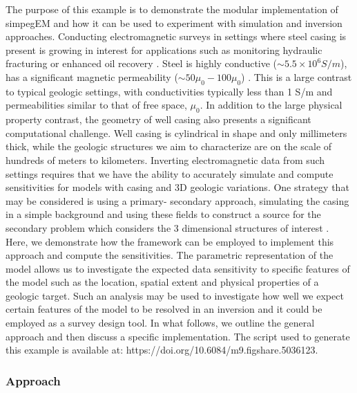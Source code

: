 The purpose of this example is to demonstrate the modular implementation of
simpegEM and how it can be used to experiment with simulation and inversion
approaches.  Conducting electromagnetic surveys in settings where steel casing
is present is growing in interest for applications such as monitoring
hydraulic fracturing or enhanced oil recovery \citep{Hoversten2015, Um2015,
Commer2015, Hoversten2014, Marsala2015, cuevas2014eage, Weiss2015,Yang2016a}. Steel is highly
conductive ($\sim 5.5\times10^6 S/m$), has a significant magnetic permeability
($\sim 50\mu_0 - 100 \mu_0$) \citep{wuhabashy1994}. This is a large
contrast to typical geologic settings, with conductivities typically less than
1 S/m and permeabilities similar to that of free space, $\mu_0$. In addition
to the large physical property contrast, the geometry of well casing also
presents a significant computational challenge. Well casing is cylindrical in
shape and only millimeters thick, while the geologic structures we aim to
characterize are on the scale of hundreds of meters to kilometers. Inverting
electromagnetic data from such settings requires that we have the ability to
accurately simulate and compute sensitivities for models with casing and 3D
geologic variations.  One strategy that may be considered is using a primary-
secondary approach, simulating the casing in a simple background and using
these fields to construct a source for the secondary problem which considers
the 3 dimensional structures of interest \citep{Heagy2015}. Here, we
demonstrate how the framework can be employed to implement this approach and
compute the sensitivities. The parametric representation of the model allows
us to investigate the expected data sensitivity to specific features of the model
such as the location, spatial extent and physical properties of a geologic
target. Such an analysis may be used to investigate how well we expect certain
features of the model to be resolved in an inversion and it could be employed as
a survey design tool. In what follows, we outline the general approach and
then discuss a specific implementation. The script used to generate this example is
available at: https://doi.org/10.6084/m9.figshare.5036123.



\subsubsection{Approach}
\label{sec:casingApproach}


